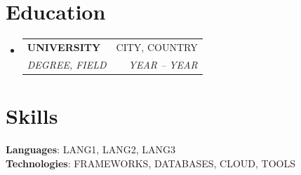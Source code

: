 \documentclass[letterpaper,11pt]{article}
\makeatletter
\newcommand{\resumeEntry}[4]{
  \vspace{-1pt}\item
    \begin{tabular*}{0.97\textwidth}[t]{l@{\extracolsep{\fill}}r}
      \textbf{#1} & #2 \\
      \textit{\small#3} & \textit{\small #4} \\
    \end{tabular*}\vspace{-6pt}
}
\newcommand{\resumeEntryStart}{\begin{itemize}[leftmargin=0.0in, label={}]}
\newcommand{\resumeEntryEnd}{\end{itemize}}
\makeatother
\begin{document}
\section{Education}
\resumeEntryStart
  \resumeEntry{UNIVERSITY}{CITY, COUNTRY}{DEGREE, FIELD}{YEAR -- YEAR}
\resumeEntryEnd

\section{Skills}
\begin{itemize}[leftmargin=0.15in, label={}]
    \small{\item{
     \textbf{Languages}{: LANG1, LANG2, LANG3} \\
     \textbf{Technologies}{: FRAMEWORKS, DATABASES, CLOUD, TOOLS} \\
    }}
\end{itemize}
\end{document}
